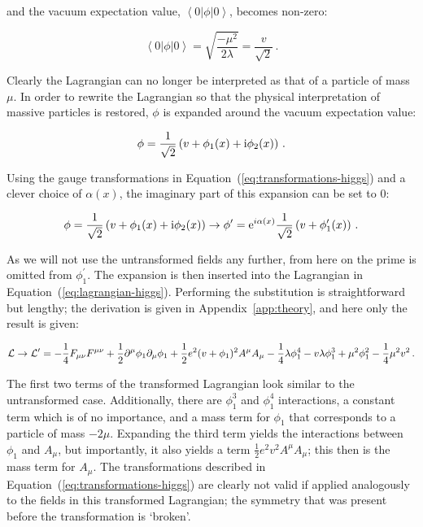 % 
and the vacuum expectation value, $\left< 0 | \phi | 0 \right>$, becomes non-zero:
% 
\begin{linenomath*}
\begin{equation}
\left< 0 | \phi | 0 \right> = \sqrt{ \frac{-\mu^2}{2\lambda} } = \frac{v}{\sqrt{2}}
\,.
\end{equation}
\end{linenomath*}
% 
Clearly the Lagrangian can no longer be interpreted as that of a particle of mass $\mu$.
% 
In order to rewrite the Lagrangian so that the physical interpretation of massive particles is restored, $\phi$ is expanded around the vacuum expectation value:
% 
\begin{linenomath*}
\begin{equation}
\label{eq:expansion-around-minimum}
\phi = \frac{1}{\sqrt{2}} \left( v + \phi_1(x) + \mathrm{i} \phi_2(x) \right)
\,.
\end{equation}
\end{linenomath*}
% 
Using the gauge transformations in Equation~(\ref{eq:transformations-higgs}) and a clever choice of $\alpha(x)$, the imaginary part of this expansion can be set to $0$:
% 
\begin{linenomath*}
\begin{equation}
\phi = \frac{1}{\sqrt{2}} \left( v + \phi_1(x) + \mathrm{i} \phi_2(x) \right)
\to
\phi^\prime = \mathrm{e}^{i\alpha(x)} \frac{1}{\sqrt{2}} \left( v + \phi^\prime_1(x) \right)
\,.
\end{equation}
\end{linenomath*}
% 
As we will not use the untransformed fields any further, from here on the prime is omitted from $\phi_1^\prime$.
% 
The expansion is then inserted into the Lagrangian in Equation~(\ref{eq:lagrangian-higgs}).
% 
Performing the substitution is straightforward but lengthy; the derivation is given in Appendix~\ref{app:theory}, and here only the result is given:
% 
\begin{linenomath*}
\begin{equation}
\mathcal{L} \to \mathcal{L}^\prime =
    -\frac{1}{4} F_{\mu\nu} F^{\mu\nu}
    + \frac{1}{2} \partial^\mu \phi_1 \partial_\mu \phi_1
    + \frac{1}{2} e^2 (v+\phi_1)^2 A^\mu A_\mu
    - \frac{1}{4}\lambda\phi_1^4 - v\lambda\phi_1^3 + \mu^2\phi_1^2 - \frac{1}{4}\mu^2 v^2
\,.
\end{equation}
\end{linenomath*}
% 
The first two terms of the transformed Lagrangian look similar to the untransformed case.
% 
Additionally, there are $\phi_1^3$ and $\phi_1^4$ interactions, a constant term which is of no importance, and a mass term for $\phi_1$ that corresponds to a particle of mass $-2\mu$.
% 
Expanding the third term yields the interactions between $\phi_1$ and $A_\mu$, but importantly, it also yields a term $\frac{1}{2}e^2v^2 A^\mu A_\mu$; this then is the mass term for $A_\mu$.
% 
The transformations described in Equation~(\ref{eq:transformations-higgs}) are clearly not valid if applied analogously to the fields in this transformed Lagrangian; the symmetry that was present before the transformation is `broken'.


